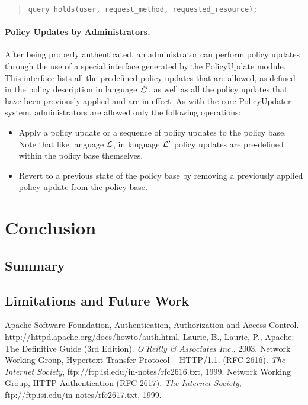 \documentclass{llncs}
\begin{document}
        \begin{quote}
          \begin{verbatim}query holds(user, request_method, requested_resource);\end{verbatim}
        \end{quote}

      \paragraph{\bf Policy Updates by Administrators.}

        After being properly authenticated, an administrator can perform policy
        updates through the use of a special interface generated by the
        PolicyUpdate module. This interface lists all the predefined policy
        updates that are allowed, as defined in the policy description in 
        language ${\cal L'}$, as well as all the policy updates that have been
        previously applied and are in effect. As with the core PolicyUpdater
        system, administrators are allowed only the following operations:

        \begin{itemize}
          \item
            Apply a policy update or a sequence of policy updates to the policy
            base. Note that like language ${\cal L}$, in language ${\cal L'}$
            policy updates are pre-defined within the policy base themselves.
          \vspace{1mm}
          \item
            Revert to a previous state of the policy base by removing a 
            previously applied policy update from the policy base. 
        \end{itemize}

  \section{Conclusion}

    \subsection{Summary}

    \subsection{Limitations and Future Work}

  \begin{thebibliography}{5}
      Apache Software Foundation,
      Authentication, Authorization and Access Control.
      http://httpd.apache.org/docs/howto/auth.html.
      Laurie, B., Laurie, P.,
      Apache: The Definitive Guide (3rd Edition).
      {\em O'Reilly \& Associates Inc.}, 2003.
      Network Working Group,
      Hypertext Transfer Protocol -- HTTP/1.1. (RFC 2616).
      {\em The Internet Society},
      ftp://ftp.isi.edu/in-notes/rfc2616.txt, 1999.
      Network Working Group,
      HTTP Authentication (RFC 2617).
      {\em The Internet Society},
      ftp://ftp.isi.edu/in-notes/rfc2617.txt, 1999.
  \end{thebibliography}
\end{document}
